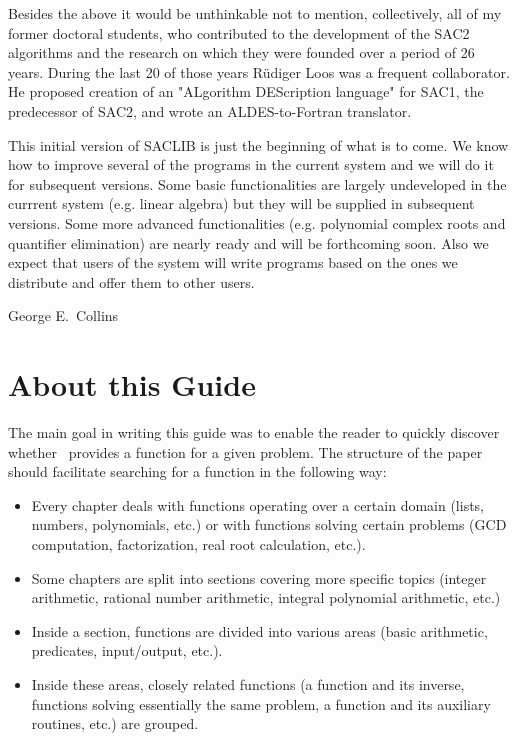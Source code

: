 Besides the above it would be unthinkable not to mention, collectively, all of
my former doctoral students, who contributed to the development of the SAC2
algorithms and the research on which they were founded over a period of 26
years.  During the last 20 of those years R\"{u}diger Loos was a frequent
collaborator.  He proposed creation of an "ALgorithm DEScription language" for
SAC1, the predecessor of SAC2, and wrote an ALDES-to-Fortran translator.

This initial version of SACLIB is just the beginning of what is to come.  We
know how to improve several of the programs in the current system and we will
do it for subsequent versions.  Some basic functionalities are largely
undeveloped in the currrent system (e.g. linear algebra) but they will be
supplied in subsequent versions.  Some more advanced functionalities (e.g.
polynomial complex roots and quantifier elimination) are nearly ready and will
be forthcoming soon.  Also we expect that users of the system will write
programs based on the ones we distribute and offer them to other users.

\begin{flushright}
George E.\ Collins
\end{flushright}


\section{About this Guide}
\label{c:I s:A}

The main goal in writing this guide was to enable the reader to quickly
discover whether \saclib\ provides a function for a given problem. The
structure of the paper should facilitate searching for a function in the
following way:
\begin{itemize}
\item Every chapter deals with functions operating over a certain domain
  (lists, numbers, polynomials, etc.) or with functions solving certain
  problems (GCD computation, factorization, real root calculation, etc.).
\item Some chapters are split into sections covering more specific topics
  (integer arithmetic, rational number arithmetic, integral polynomial
  arithmetic, etc.)
\item Inside a section, functions are divided into various areas (basic
  arithmetic, predicates, input/output, etc.).
\item Inside these areas, closely related functions (a function and its
  inverse, functions solving essentially the same problem, a function and
  its auxiliary routines, etc.) are grouped.
\end{itemize}

